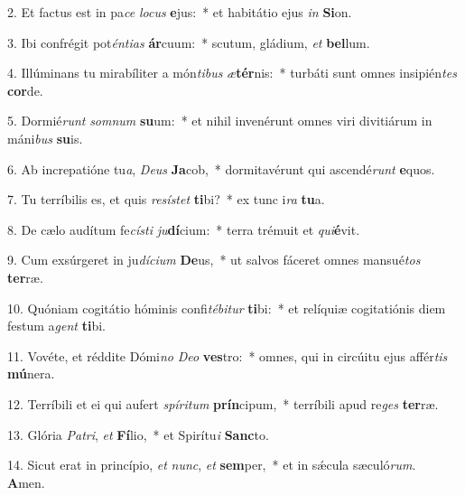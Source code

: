 2. Et factus est in pa\textit{ce} \textit{lo}\textit{cus} \textbf{e}jus:~*  et habitátio ejus \textit{in} \textbf{Si}on.\

3. Ibi confrégit pot\textit{én}\textit{ti}\textit{as} \textbf{ár}cuum:~*  scutum, gládium, \textit{et} \textbf{bel}lum.\

4. Illúminans tu mirabíliter a món\textit{ti}\textit{bus} \textit{æ}\textbf{tér}nis:~*  turbáti sunt omnes insipién\textit{tes} \textbf{cor}de.\

5. Dormié\textit{runt} \textit{som}\textit{num} \textbf{su}um:~*  et nihil invenérunt omnes viri divitiárum in máni\textit{bus} \textbf{su}is.\

6. Ab increpatióne tu\textit{a}, \textit{De}\textit{us} \textbf{Ja}cob,~*  dormitavérunt qui ascendé\textit{runt} \textbf{e}quos.\

7. Tu terríbilis es, et quis \textit{re}\textit{sís}\textit{tet} \textbf{ti}bi?~*  ex tunc i\textit{ra} \textbf{tu}a.\

8. De cælo audítum fe\textit{cís}\textit{ti} \textit{ju}\textbf{dí}cium:~*  terra trémuit et \textit{qui}\textbf{é}vit.\

9. Cum exsúrgeret in ju\textit{dí}\textit{ci}\textit{um} \textbf{De}us,~*  ut salvos fáceret omnes mansué\textit{tos} \textbf{ter}ræ.\

10. Quóniam cogitátio hóminis confi\textit{té}\textit{bi}\textit{tur} \textbf{ti}bi:~*  et relíquiæ cogitatiónis diem festum a\textit{gent} \textbf{ti}bi.\

11. Vovéte, et réddite Dómi\textit{no} \textit{De}\textit{o} \textbf{ves}tro:~*  omnes, qui in circúitu ejus affér\textit{tis} \textbf{mú}nera.\

12. Terríbili et ei qui aufert \textit{spí}\textit{ri}\textit{tum} \textbf{prín}cipum,~*  terríbili apud re\textit{ges} \textbf{ter}ræ.\

13. Glória \textit{Pa}\textit{tri}, \textit{et} \textbf{Fí}lio,~*  et Spirítu\textit{i} \textbf{Sanc}to.\

14. Sicut erat in princípio, \textit{et} \textit{nunc}, \textit{et} \textbf{sem}per,~*  et in sǽcula sæculó\textit{rum}. \textbf{A}men.\

